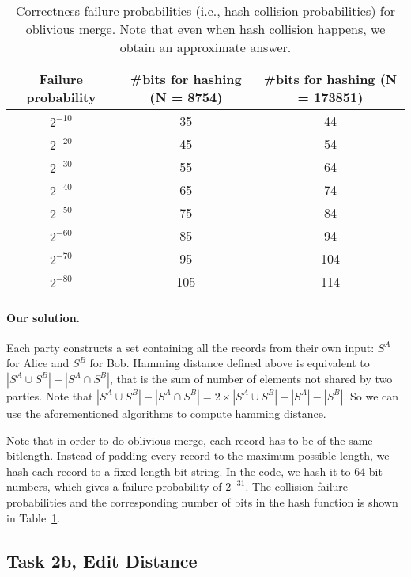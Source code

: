 \begin{table}[t]
  \centering
  \begin{tabular}{c|c|c}
    Failure probability&  \#bits for hashing (N = 8754)   & \#bits for hashing (N = 173851) \\ \hline
    $2^{-10}$ & 35 & 44 \\
    $2^{-20}$ &45 & 54 \\
    $2^{-30}$ & 55 & 64 \\
    $2^{-40}$ & 65& 74 \\
    $2^{-50}$ & 75& 84 \\
    $2^{-60}$ & 85 & 94 \\
    $2^{-70}$ & 95 & 104 \\
    $2^{-80}$ & 105 & 114 \\
  \end{tabular}
  \caption{Correctness failure probabilities (i.e., hash collision probabilities) 
for oblivious merge. 
Note that even when hash collision happens, we obtain an 
approximate answer.}
  \label{fig:failure-hashing}
\end{table}



\paragraph{Our solution.}
Each party constructs a set containing all the records from their own input: $S^A$ for Alice and $S^B$ for Bob.
Hamming distance defined above is equivalent to $|S^A\cup S^B| - |S^A\cap S^B|$, that is the sum of number of elements not shared by two parties.
Note that $|S^A\cup S^B| - |S^A\cap S^B| = 2\times|S^A\cup S^B|-|S^A| - |S^B|$. So we can use the aforementioned algorithms to compute hamming distance.

Note that in order to do oblivious merge, each record has to be of the same bitlength. Instead of padding every record to the maximum possible length, we hash each
record to a fixed length bit string. In the code, we hash it to 64-bit numbers, which gives a failure probability of $2^{-31}$. The collision failure probabilities and the corresponding number of bits in the hash function is shown in Table~\ref{fig:failure-hashing}.

\subsection{Task 2b, Edit Distance}
